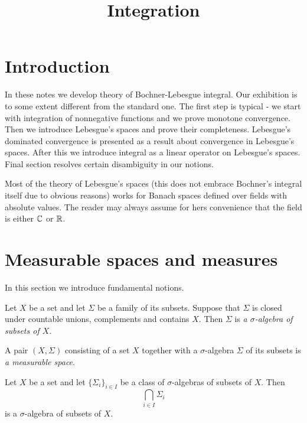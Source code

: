 



\title{Integration}
\date{}
\maketitle

\section{Introduction}
In these notes we develop theory of Bochner-Lebesgue integral. Our exhibition is to some extent different from the standard one. The first step is typical - we start with integration of nonnegative functions and we prove monotone convergence. Then we introduce Lebesgue's spaces and prove their completeness. Lebesgue's dominated convergence is presented as a result about convergence in Lebesgue's spaces. After this we introduce integral as a linear operator on Lebesgue's spaces. Final section resolves certain disambiguity in our notions.

Most of the theory of Lebesgue's spaces (this does not embrace Bochner's integral itself due to obvious reasons) works for Banach spaces defined over fields with absolute values. The reader may always assume for hers convenience that the field is either ${\mathbb C}$ or ${\mathbb R}$.


\section{Measurable spaces and measures}
\noindent
In this section we introduce fundamental notions.

\begin{definition}
    Let $X$ be a set and let $\Sigma$ be a family of its subsets. Suppose that $\Sigma$ is closed under countable unions, complements and contains $X$. Then $\Sigma$ is \textit{a $\sigma$-algebra of subsets of $X$}. 
\end{definition}

\begin{definition}
    A pair $(X,\Sigma)$ consisting of a set $X$ together with a $\sigma$-algebra $\Sigma$ of its subsets is \textit{a measurable space}.
\end{definition}

\begin{remark}\label{remark:sigma_algebras_are_closed_under_arbitrary_intersections}
    Let $X$ be a set and let $\{\Sigma_i\}_{i\in I}$ be a class of $\sigma$-algebras of subsets of $X$. Then 
    $$\bigcap_{i\in I}\Sigma_i$$
    is a $\sigma$-algebra of subsets of $X$.
\end{remark}

